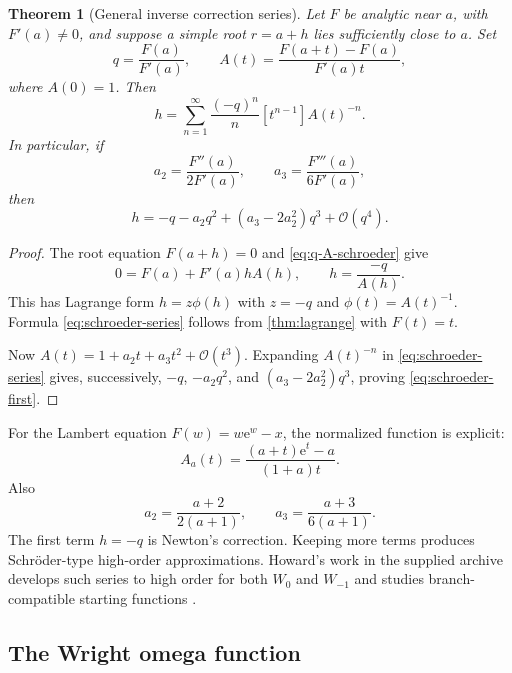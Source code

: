 \documentclass[11pt]{article}
\numberwithin{equation}{section}
\newtheorem{theorem}{Theorem}[section]
\theoremstyle{definition}
\theoremstyle{remark}
\newcommand{\e}{\mathrm e}
\begin{document}
\begin{theorem}[General inverse correction series]
\label{thm:schroeder-general}
Let $F$ be analytic near $a$, with $F'(a)\ne0$, and suppose a simple root
$r=a+h$ lies sufficiently close to $a$.  Set
\begin{equation}
 q=\frac{F(a)}{F'(a)},
 \qquad
 A(t)=\frac{F(a+t)-F(a)}{F'(a)t},                      \label{eq:q-A-schroeder}
\end{equation}
where $A(0)=1$.  Then
\begin{equation}
 h=\sum_{n=1}^{\infty}\frac{(-q)^n}{n}
    [t^{n-1}]A(t)^{-n}.                               \label{eq:schroeder-series}
\end{equation}
In particular, if
\[
 a_2=\frac{F''(a)}{2F'(a)},
 \qquad
 a_3=\frac{F'''(a)}{6F'(a)},
\]
then
\begin{equation}
 h=-q-a_2q^2+(a_3-2a_2^2)q^3+\mathcal O(q^4).         \label{eq:schroeder-first}
\end{equation}
\end{theorem}

\begin{proof}
The root equation $F(a+h)=0$ and \eqref{eq:q-A-schroeder} give
\[
 0=F(a)+F'(a)hA(h),
 \qquad
 h=\frac{-q}{A(h)}.
\]
This has Lagrange form $h=z\phi(h)$ with $z=-q$ and
$\phi(t)=A(t)^{-1}$.  Formula \eqref{eq:schroeder-series} follows from
\cref{thm:lagrange} with $F(t)=t$.

Now $A(t)=1+a_2t+a_3t^2+\mathcal O(t^3)$.  Expanding
$A(t)^{-n}$ in \eqref{eq:schroeder-series} gives, successively,
$-q$, $-a_2q^2$, and $(a_3-2a_2^2)q^3$, proving
\eqref{eq:schroeder-first}.
\end{proof}

For the Lambert equation $F(w)=w\e^w-x$, the normalized function is explicit:
\begin{equation}
 A_a(t)=\frac{(a+t)\e^t-a}{(1+a)t}.                   \label{eq:A-lambert}
\end{equation}
Also
\begin{equation}
 a_2=\frac{a+2}{2(a+1)},
 \qquad
 a_3=\frac{a+3}{6(a+1)}.                              \label{eq:lambert-a2-a3}
\end{equation}
The first term $h=-q$ is Newton's correction.  Keeping more terms produces
Schröder-type high-order approximations.  Howard's work in the supplied
archive develops such series to high order for both $W_0$ and $W_{-1}$ and
studies branch-compatible starting functions \cite{Howard2025}.

\subsection{The Wright omega function}
\end{document}
